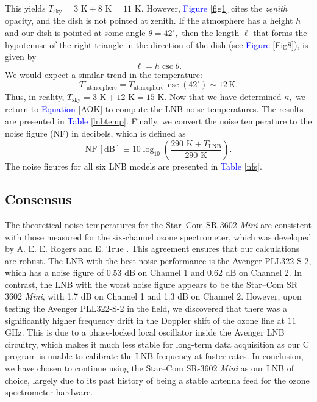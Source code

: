 \documentclass[11pt]{article}
\begin{document}
\noindent This yields $T_\text{sky} = 3\text{ K} + 8\text{ K} = 11 \text{ K}.$ However, \textcolor{blue}{Figure} \ref{fig1} cites the \textit{zenith} opacity, and the dish is not pointed at zenith. If the atmosphere has a height $h$ and our dish is pointed at some angle $\theta=42^\circ,$ then the length $\ell$ that forms the hypotenuse of the right triangle in the direction of the dish (see \textcolor{blue}{Figure} \ref{Fig8}), is given by
	\begin{equation}
		\ell = h\csc\theta.
	\end{equation}
We would expect a similar trend in the temperature:
	\begin{equation}
		T'_\text{atmosphere} = T_\text{atmosphere}\,\csc(42^\circ)\sim 12\,\text{K}.
	\end{equation}
Thus, in reality, $T_\text{sky}=3\text{ K}+12\text{ K}=15\text{ K}.$ Now that we have determined $\kappa,$ we return to \textcolor{blue}{Equation} \ref{AOK} to compute the LNB noise temperatures. The results are presented in \textcolor{blue}{Table} \ref{lnbtemp}. Finally, we convert the noise temperature to the noise figure (NF) in decibels, which is defined as
	\begin{equation}
		\text{NF}\,[\text{dB}]\equiv 10\log_{10}\left(\frac{290\text{ K}+T_\text{LNB}}{290\text{ K}}\right).
	\end{equation}
The noise figures for all six LNB models are presented in \textcolor{blue}{Table} \ref{nfs}. 
\subsection{Consensus}
The theoretical noise temperatures for the Star--Com SR-3602 \textit{Mini} are consistent with those measured for the six-channel ozone spectrometer, which was developed by A. E. E. Rogers and E. True \cite{True2014}. This agreement ensures that our calculations are robust. The LNB with the best noise performance is the Avenger PLL322-S-2, which has a noise figure of 0.53 dB on Channel 1 and 0.62 dB on Channel 2. In contrast, the LNB with the worst noise figure appears to be the Star--Com SR 3602 \textit{Mini}, with 1.7 dB on Channel 1 and 1.3 dB on Channel 2. However, upon testing the Avenger PLL322-S-2 in the field, we discovered that there was a significantly higher frequency drift in the Doppler shift of the ozone line at $11$ GHz. This is due to a phase-locked local oscillator inside the Avenger LNB circuitry, which makes it much less stable for long-term data acquisition as our C program is unable to calibrate the LNB frequency at faster rates. In conclusion, we have chosen to continue using the Star--Com SR-3602 \textit{Mini} as our LNB of choice, largely due to its past history of being a stable antenna feed for the ozone spectrometer hardware.
\end{document}
